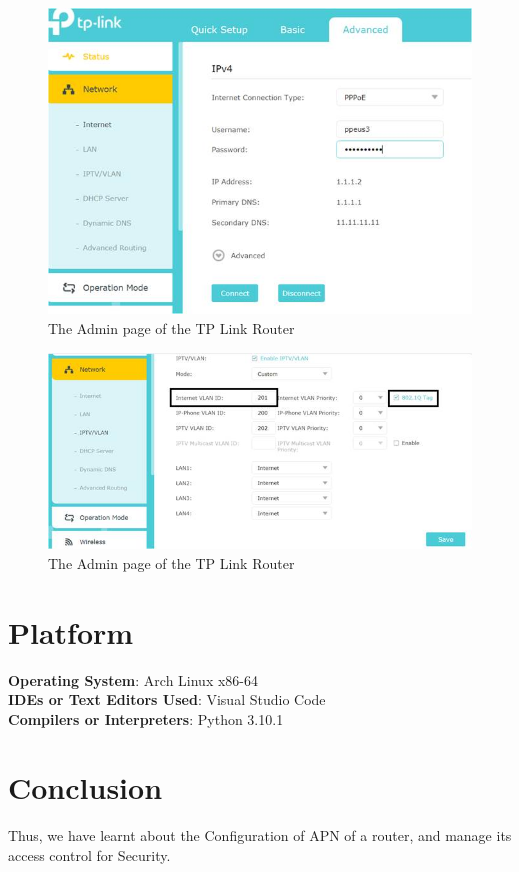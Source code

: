 \documentclass[11pt]{article}
\begin{document}
\begin{figure}[H]
    \centering
    \includegraphics[width=.85\textwidth]{lab router/tp link 2.png}
    \caption{The Admin page of the TP Link Router}
\end{figure}

\begin{figure}[H]
    \centering
    \includegraphics[width=.85\textwidth]{lab router/tp link 3.png}
    \caption{The Admin page of the TP Link Router}
\end{figure}

\section{Platform}
\textbf{Operating System}: Arch Linux x86-64 \\
\textbf{IDEs or Text Editors Used}: Visual Studio Code\\
\textbf{Compilers or Interpreters}: Python 3.10.1\\

\section{Conclusion}
Thus, we have learnt about the Configuration of APN of a router, and manage its access control for Security.
\end{document}
